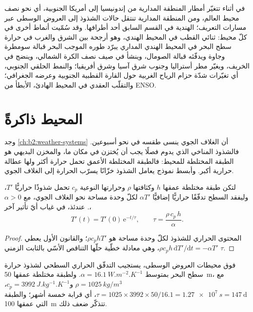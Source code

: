في أثناء  تتغيّر أمطار المنطقة المدارية من إندونيسيا إلى أمريكا الجنوبية، أي نحو نصف
محيط العالم، ومن المنطقة المدارية تنتقل حالات الشذوذ إلى العروض الوسطى عبر مسارات
التعريف؛  الهندية في القسم السابق أحد أطرافها. وقد سُمّيت أنماط أخرى
في كلّ محيط: ثنائي القطب في المحيط الهندي، وهو أرجحة بين الشرق والغرب في حرارة سطح
البحر في المحيط الهندي المداري يبرّد طوره الموجب البحر قبالة سومطرة وجاوة
ويدفّئه قبالة الصومال، وينشأ في صيف نصف الكرة الشمالي، وينضج في الخريف، ويغيّر
مطر أستراليا وجنوب شرق آسيا وشرق أفريقيا؛ والنمط الحلقي الجنوبي، أي تغيّرات
شدّة حزام الرياح الغربية حول القارة القطبية الجنوبية وعرضه الجغرافي؛ والتقلّب العقدي في
المحيط الهادئ، الأبطأ من ENSO.

\section{المحيط ذاكرةً}\label{sec:b2:climate-variability:memory}

وجد \cref{ch:b2:weather-systems} أن الغلاف الجوي ينسى طقسه في نحو أسبوعين.
فالشذوذ المناخي الذي يدوم فصلًا يجب أن يُختزن في مكان ما، والمخزن البديهي هو الطبقة
المختلطة للمحيط: فالطبقة المختلطة الأعمق تحمل حرارة أكثر ولها عطالة حرارية أكبر. وأبسط نموذج يعامل
الشذوذ خزّانًا يسرّب الحرارة إلى الغلاف الجوي.

\begin{proposition}\label{prop:b2:climate-variability:damping}
لتكن طبقة مختلطة عمقها $h$ وكثافتها $\rho$ وحرارتها النوعية $c_p$ تحمل شذوذًا حراريًّا
$T'$، وليفقد السطح تدفّقًا حراريًّا إضافيًّا $\alpha T'$ لكلّ وحدة مساحة نحو الغلاف الجوي،
مع $\alpha > 0$. عندئذ، في غياب أيّ تأثير آخر،
\[
  T'(t) = T'(0)\,\mathrm{e}^{-t/\tau}, \qquad \tau = \frac{\rho\,c_p\,h}{\alpha} .
\]
\end{proposition}

\begin{proof}
المحتوى الحراري للشذوذ لكلّ وحدة مساحة هو $\rho c_p h T'$؛ والقانون الأول يعطي $\rho c_p h
\,\mathrm{d}T'/\mathrm{d}t = -\alpha T'$، وهي معادلة خطّية حلّها التناقص
الأسّي بالثابت الزمني $\tau$.
\end{proof}

\begin{example}\label{ex:b2:climate-variability:tau}
فوق محيطات العروض الوسطى، يستجيب التدفّق الحراري السطحي لشذوذ حرارة سطح
البحر بمتوسط $\alpha = \qty{16.1}{W.m^{-2}.K^{-1}}$. ولطبقة مختلطة
عمقها \qty{50}{m}، مع $\rho = \qty{1025}{kg/m^3}$ و$c_p = \qty{3992}{J.kg^{-1}.K^{-1}}$،
$\tau = 1025 \times 3992 \times 50/16.1 = \qty{1.27e7}{s} = \qty{147}{\day}$، أي قرابة خمسة
أشهر؛ والطبقة التي عمقها \qty{100}{m} تتذكّر ضعف ذلك.
\end{example}

